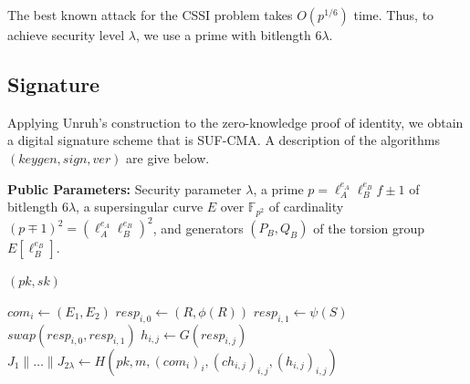 \documentclass{amsart}
\theoremstyle{plain}
\theoremstyle{remark}
\numberwithin{equation}{section}
\begin{document}
The best known attack for the CSSI problem takes $O(p^{1/6})$ time. Thus, to achieve security level $\lambda$, we use a prime with bitlength $6\lambda$.



\subsection{Signature}
Applying Unruh's construction to the zero-knowledge proof of identity, we obtain a digital signature scheme that is SUF-CMA. A description of the algorithms $(keygen,sign,ver)$ are give below.

\vspace{2mm}
{\bf Public Parameters:} Security parameter $\lambda$, a prime $p = \ell_A^{e_A}\ell_B^{e_B}f \pm 1$ of bitlength $6\lambda$, a supersingular curve $E$ over $\mathbb{F}_{p^2}$ of cardinality $(p \mp 1)^2 = (\ell_A^{e_A}\ell_B^{e_B})^2$, and generators $(P_B,Q_B)$ of the torsion group $E[\ell_B^{e_B}]$.

\begin{algorithm}[ht]
\caption*{$keygen(\lambda)$}
\begin{algorithmic}
\RETURN $(pk,sk)$
\end{algorithmic}
\end{algorithm}

\begin{algorithm}[ht]
\caption*{$sign(sk,m)$}
\begin{algorithmic}
	\STATE $com_i \leftarrow (E_1,E_2)$
	\STATE $resp_{i,0} \leftarrow (R,\phi(R))$
	\STATE $resp_{i,1} \leftarrow \psi(S)$
		\STATE $swap(resp_{i,0},resp_{i,1})$
	\ENDIF
	\STATE $h_{i,j} \leftarrow G(resp_{i,j})$
\ENDFOR
\vspace{2mm}
\STATE $J_1 \| \dots \| J_{2\lambda} \leftarrow H(pk,m, (com_i)_i, (ch_{i,j})_{i,j}, (h_{i,j})_{i,j})$ 
\vspace{2mm}
\end{algorithmic}
\end{algorithm}
\end{document}
